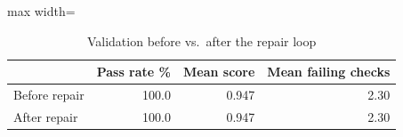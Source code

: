 \begin{table}[t]
\centering
\scriptsize
\caption{Validation before vs.\ after the repair loop}
\label{tab:repair}
\setlength{\tabcolsep}{3.5pt}
\begin{adjustbox}{max width=\columnwidth}
\begin{tabular}{lrrr}
\toprule
\textbf{} & \textbf{Pass rate \%} & \textbf{Mean score} & \textbf{Mean failing checks} \\
\midrule
Before repair & 100.0 & 0.947 & 2.30 \\
After repair & 100.0 & 0.947 & 2.30 \\
\bottomrule
\end{tabular}
\end{adjustbox}
\end{table}
